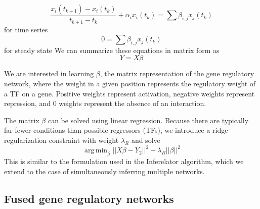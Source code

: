 \documentclass[11pt]{article}
\DeclareMathOperator*{\argmin}{arg\,min}
\begin{document}
\begin{equation}
\frac{x_i(t_{k+1})-x_i(t_k)}{t_{k+1}-t_k} + \alpha_{i}x_{i}(t_k)= \sum \beta_{i,j}x_{j}(t_k)
\end{equation}
for time series
\begin{equation}
0 = \sum \beta_{i,j}x_{j}(t_k)
\end{equation}
for steady state
\noindent We can summarize these equations in matrix form as
\begin{equation}
Y = X \beta 
\end{equation}

We are interested in learning $\beta$, the matrix representation of the gene regulatory network, where the weight in a given position represents the regulatory weight of a TF on a gene. Positive weights represent activation, negative weights represent repression, and 0 weights represent the absence of an interaction. 

\noindent The matrix $\beta$ can be solved using linear regression. Because there are typically far fewer conditions than possible regressors (TFs), we introduce a ridge regularization constraint with weight $\lambda_R$ and solve
\begin{equation}
\argmin_\beta\vert \vert X\beta - Y_2 \vert \vert ^2 + \lambda_R \vert \vert \beta \vert \vert ^2
\end{equation}
This is similar to the formulation used in the Inferelator algorithm, which we extend to the case of simultaneously inferring multiple networks. 

\subsection{Fused gene regulatory networks}
\end{document}
